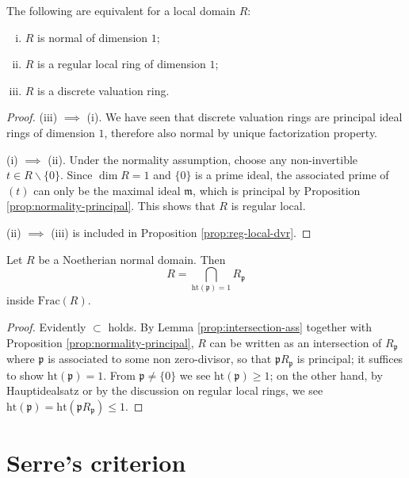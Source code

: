 \begin{corollary}\label{prop:normality-dvr}
	The following are equivalent for a local domain $R$:
	\begin{enumerate}[(i)]
		\item $R$ is normal of dimension $1$;
		\item $R$ is a regular local ring of dimension $1$;
		\item $R$ is a discrete valuation ring.
	\end{enumerate}
\end{corollary}
\begin{proof}
	(iii) $\implies$ (i). We have seen that discrete valuation rings are principal ideal rings of dimension $1$, therefore also normal by unique factorization property.
	
	(i) $\implies$ (ii). Under the normality assumption, choose any non-invertible $t \in R \smallsetminus \{0\}$. Since $\dim R = 1$ and $\{0\}$ is a prime ideal, the associated prime of $(t)$ can only be the maximal ideal $\mathfrak{m}$, which is principal by Proposition \ref{prop:normality-principal}. This shows that $R$ is regular local.
	
	(ii) $\implies$ (iii) is included in Proposition \ref{prop:reg-local-dvr}.
\end{proof}

\begin{corollary}
	Let $R$ be a Noetherian normal domain. Then
	\[ R = \bigcap_{\mathrm{ht}(\mathfrak{p}) = 1} R_{\mathfrak{p}} \]
	inside $\mathrm{Frac}(R)$.
\end{corollary}
\begin{proof}
	Evidently $\subset$ holds. By Lemma \ref{prop:intersection-ass} together with Proposition \ref{prop:normality-principal}, $R$ can be written as an intersection of $R_{\mathfrak{p}}$ where $\mathfrak{p}$ is associated to some non zero-divisor, so that $\mathfrak{p}R_{\mathfrak{p}}$ is principal; it suffices to show $\text{ht}(\mathfrak{p})=1$. From $\mathfrak{p} \neq \{0\}$ we see $\text{ht}(\mathfrak{p}) \geq 1$; on the other hand, by Hauptidealsatz or by the discussion on regular local rings, we see $\text{ht}(\mathfrak{p}) = \text{ht}(\mathfrak{p}R_{\mathfrak{p}}) \leq 1$.
\end{proof}

\section{Serre's criterion}

